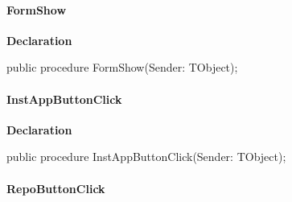 \documentclass{report}
\newif\ifpdf
\begin{document}
\paragraph*{FormShow}\hspace*{\fill}

\label{manager.TMnFrm-FormShow}
\begin{list}{}{
\setlength{\itemindent}{0cm}
\setlength{\listparindent}{0cm}
\setlength{\leftmargin}{\evensidemargin}
\addtolength{\leftmargin}{\tmplength}
\settowidth{\labelsep}{X}
\addtolength{\leftmargin}{\labelsep}
\setlength{\labelwidth}{\tmplength}
}
\item[\textbf{Declaration}\hfill]
\ifpdf
\begin{flushleft}
\fi
\begin{ttfamily}
public procedure FormShow(Sender: TObject);\end{ttfamily}

\ifpdf
\end{flushleft}
\fi

\end{list}
\paragraph*{InstAppButtonClick}\hspace*{\fill}

\label{manager.TMnFrm-InstAppButtonClick}
\begin{list}{}{
\setlength{\itemindent}{0cm}
\setlength{\listparindent}{0cm}
\setlength{\leftmargin}{\evensidemargin}
\addtolength{\leftmargin}{\tmplength}
\settowidth{\labelsep}{X}
\addtolength{\leftmargin}{\labelsep}
\setlength{\labelwidth}{\tmplength}
}
\item[\textbf{Declaration}\hfill]
\ifpdf
\begin{flushleft}
\fi
\begin{ttfamily}
public procedure InstAppButtonClick(Sender: TObject);\end{ttfamily}

\ifpdf
\end{flushleft}
\fi

\end{list}
\paragraph*{RepoButtonClick}\hspace*{\fill}
\end{document}
